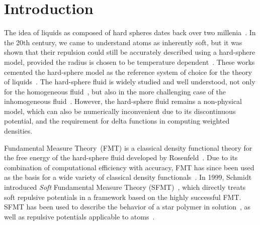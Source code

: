 \documentclass[letterpaper,twocolumn,amsmath,amssymb,prb]{revtex4-1}
\begin{document}
\section{Introduction}
The idea of liquids as composed of hard spheres dates back over two
millenia~\cite{lucretius}.  In the 20th century, we came to understand
atoms as inherently soft, but it was shown that their repulsion could
still be accurately described using a hard-sphere model, provided the
radius is chosen to be temperature
dependent~\cite{rowlinson1964statistical, barker1967perturbation,
  andersen1971relationship}.  These works cemented the hard-sphere
model as the reference system of choice for the theory of
liquids~\cite{gil-villegas-1997-SAFT-VR, clark2006developing,
  lafitte2013accurate}.  The hard-sphere fluid is
widely studied and well understood, not only for the homogeneous
fluid~\cite{carnahan1969equation}, but also in the more challenging
case of the inhomogeneous fluid~\cite{rosenfeld1989, rosenfeld1997,
  roth2002whitebear}.  However, the hard-sphere fluid remains a
non-physical model, which can also be numerically inconvenient due to its
discontinuous potential, and the requirement for delta functions in
computing weighted densities.

Fundamental Measure Theory~(FMT) is a classical density functional
theory for the free energy of the hard-sphere fluid developed by
Rosenfeld~\cite{rosenfeld1989}.  Due to its combination of
computational efficiency with accuracy, FMT has since been used as the
basis for a wide variety of classical density
functionals~\cite{cuesta1997dimensional, hansen2009fundamental,
  marechal2013density, hughes2013classical, krebs2014improved}.
%
In 1999, Schmidt introduced \emph{Soft} Fundamental Measure Theory
(SFMT)~\cite{schmidt1999density}, which directly treats soft repulsive
potentials in a framework based on the highly successful FMT.  SFMT
has been used to describe the behavior of a star polymer in
solution~\cite{schmidt2000density, groh2001density, kim2001adsorption,
  sweatman2002fundamental}, as well as repulsive potentials applicable
to atoms~\cite{schmidt2000fluid, sweatman2002fundamental}.

\end{document}
